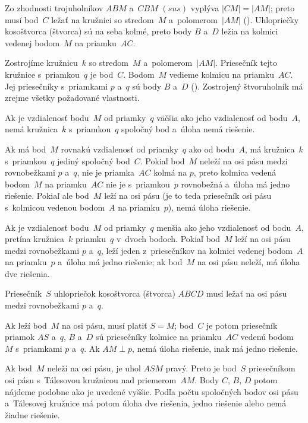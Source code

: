 {%
Zo zhodnosti trojuholníkov $ABM$ a~$CBM$ $(sus)$ vyplýva $|CM|=|AM|$; preto musí bod~$C$ ležať na kružnici so stredom~$M$ a~polomerom~$|AM|$ (\obr). Uhlopriečky kosoštvorca (štvorca) sú na seba kolmé, preto body $B$ a~$D$ ležia na kolmici vedenej bodom~$M$ na priamku~$AC$.

\konstrukcia
Zostrojíme kružnicu~$k$ so stredom~$M$ a~polomerom~$|AM|$. Priesečník tejto kružnice s~priamkou~$q$ je bod~$C$. Bodom~$M$ vedieme kolmicu na priamku~$AC$. Jej priesečníky s~priamkami $p$ a~$q$ sú body $B$ a~$D$ (\obr).
Zostrojený štvoruholník má zrejme všetky požadované vlastnosti.

\diskusia
Ak je vzdialenosť bodu~$M$ od priamky~$q$ väčšia ako jeho vzdialenosť od bodu~$A$, nemá kružnica~$k$ s~priamkou~$q$ spoločný bod a~úloha nemá riešenie.

Ak má bod~$M$ rovnakú vzdialenosť od priamky~$q$ ako od bodu~$A$, má kružnica~$k$ s~priamkou~$q$ jediný spoločný bod~$C$. Pokiaľ bod~$M$ neleží na osi pásu medzi rovnobežkami $p$ a~$q$, nie je priamka~$AC$ kolmá na $p$, preto kolmica vedená bodom~$M$ na priamku~$AC$ nie je s~priamkou~$p$ rovnobežná a~úloha má jedno riešenie. Pokiaľ ale bod~$M$ leží na osi pásu (je to teda priesečník osi pásu s~kolmicou vedenou bodom~$A$ na priamku~$p$), nemá úloha riešenie.

Ak je vzdialenosť bodu~$M$ od priamky~$q$ menšia ako jeho vzdialenosť od bodu~$A$, pretína kružnica~$k$ priamku~$q$ v~dvoch bodoch. Pokiaľ bod~$M$ leží na osi pásu medzi rovnobežkami $p$ a~$q$, leží jeden z~priesečníkov na kolmici vedenej bodom~$A$ na priamku~$p$ a~úloha má jedno riešenie; ak bod~$M$ na osi pásu neleží, má úloha dve riešenia.

\ineriesenie
Priesečník~$S$ uhlopriečok kosoštvorca (štvorca) $ABCD$ musí ležať na osi pásu medzi rovnobežkami $p$ a~$q$.

Ak leží bod~$M$ na osi pásu, musí platiť $S=M$; bod~$C$ je potom priesečník priamok $AS$ a~$q$, $B$ a~$D$ sú priesečníky kolmice na priamku~$AC$ vedenú bodom~$M$ s~priamkami $p$ a~$q$. Ak $AM \perp p$, nemá úloha riešenie, inak má jedno riešenie.

Ak bod~$M$ neleží na osi pásu, je uhol $ASM$ pravý. Preto je bod~$S$ priesečníkom osi pásu s~Tálesovou kružnicou nad priemerom~$AM$. Body $C$, $B$, $D$ potom nájdeme podobne ako je uvedené vyššie. Podľa počtu spoločných bodov osi pásu a~Tálesovej kružnice má potom úloha dve riešenia, jedno riešenie alebo nemá žiadne riešenie.

}
